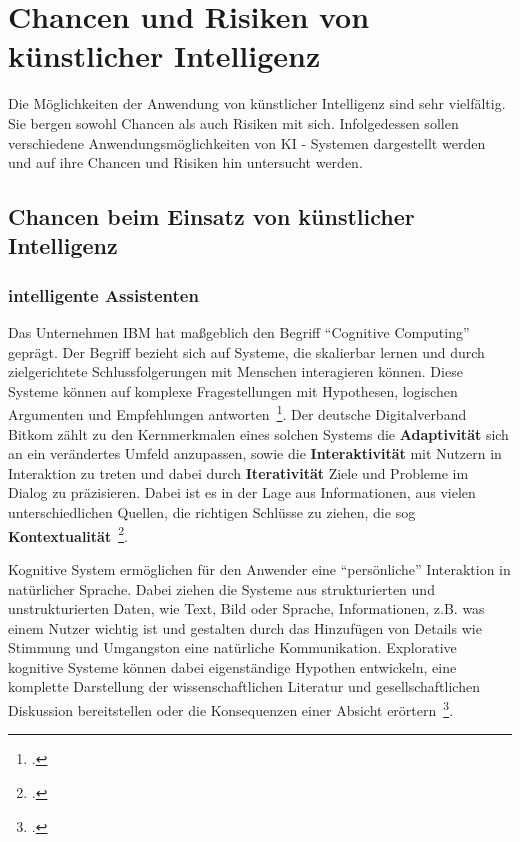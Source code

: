 \section{Chancen und Risiken von künstlicher Intelligenz} \label{Chancen und Risken von KI}
Die Möglichkeiten der Anwendung von künstlicher Intelligenz sind sehr vielfältig. Sie bergen sowohl Chancen als auch Risiken mit sich. 
Infolgedessen sollen verschiedene Anwendungsmöglichkeiten von KI - Systemen dargestellt werden und auf ihre Chancen und Risiken hin untersucht werden. 

\subsection{Chancen beim Einsatz von künstlicher Intelligenz}
\subsubsection{intelligente Assistenten}
Das Unternehmen IBM hat maßgeblich den Begriff \enquote{Cognitive Computing} geprägt. Der Begriff bezieht sich auf Systeme,
die skalierbar lernen und durch zielgerichtete Schlussfolgerungen mit Menschen interagieren können.
Diese Systeme können auf komplexe Fragestellungen mit Hypothesen, logischen Argumenten und Empfehlungen antworten~\footcite[\vglf][]{Scherk.2017}.
Der deutsche Digitalverband Bitkom zählt zu den Kernmerkmalen eines solchen Systems die \textbf{Adaptivität} sich an ein verändertes Umfeld anzupassen, sowie die 
\textbf{Interaktivität} mit Nutzern in Interaktion zu treten und dabei durch \textbf{Iterativität} Ziele und Probleme im Dialog zu präzisieren. Dabei ist es in der Lage
aus Informationen, aus vielen unterschiedlichen Quellen, die richtigen Schlüsse zu ziehen, die sog \textbf{Kontextualität}~\footcite[\vglf][]{Scherk.2017}.

Kognitive System ermöglichen für den Anwender eine \enquote{persönliche} Interaktion in natürlicher Sprache. Dabei ziehen die Systeme aus strukturierten und unstrukturierten
Daten, wie Text, Bild oder Sprache, Informationen, z.B. was einem Nutzer wichtig ist und gestalten durch das Hinzufügen von Details wie Stimmung und Umgangston eine natürliche 
Kommunikation. 
Explorative kognitive Systeme können dabei eigenständige Hypothen entwickeln, eine komplette Darstellung der wissenschaftlichen Literatur und gesellschaftlichen
Diskussion bereitstellen oder die Konsequenzen einer Absicht erörtern~\footcite[\vglf][]{Scherk.2017}.

